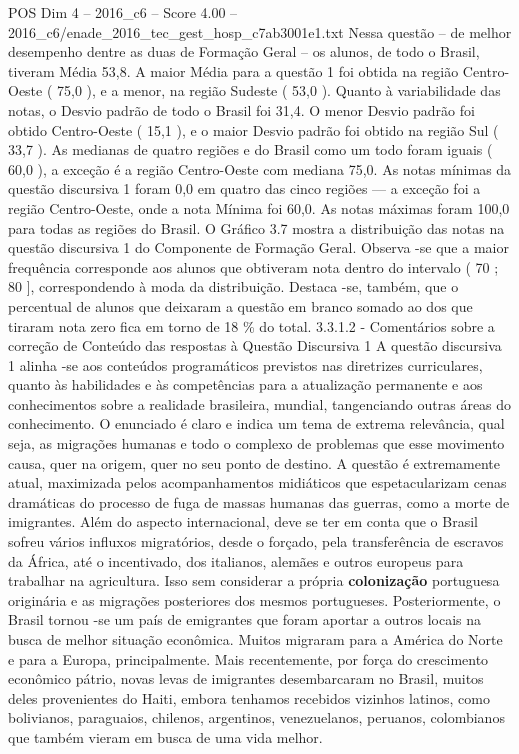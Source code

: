\begin{textsample}{POS Dim 4 – 2016\_c6 – Score 4.00 – 2016\_c6/enade\_2016\_tec\_gest\_hosp\_c7ab3001e1.txt}
Nessa questão – de melhor desempenho dentre as duas de Formação Geral – os alunos, de todo o Brasil, tiveram Média 53,8.
A maior Média para a questão 1 foi obtida na região Centro-Oeste ( 75,0 ), e a menor, na região Sudeste ( 53,0 ).
Quanto à variabilidade das notas, o Desvio padrão de todo o Brasil foi 31,4.
O menor Desvio padrão foi obtido Centro-Oeste ( 15,1 ), e o maior Desvio padrão foi obtido na região Sul ( 33,7 ).
As medianas de quatro regiões e do Brasil como um todo foram iguais ( 60,0 ), a exceção é a região Centro-Oeste com mediana 75,0.
As notas mínimas da questão discursiva 1 foram 0,0 em quatro das cinco regiões — a exceção foi a região Centro-Oeste, onde a nota Mínima foi 60,0.
As notas máximas foram 100,0 para todas as regiões do Brasil.
O Gráfico 3.7 mostra a distribuição das notas na questão discursiva 1 do Componente de Formação Geral.
Observa -se que a maior frequência corresponde aos alunos que obtiveram nota dentro do intervalo ( 70 ; 80 ], correspondendo à moda da distribuição.
Destaca -se, também, que o percentual de alunos que deixaram a questão em branco somado ao dos que tiraram nota zero fica em torno de 18 \% do total. 3.3.1.2 - Comentários sobre a correção de Conteúdo das respostas à Questão Discursiva 1 A questão discursiva 1 alinha -se aos conteúdos programáticos previstos nas diretrizes curriculares, quanto às habilidades e às competências para a atualização permanente e aos conhecimentos sobre a realidade brasileira, mundial, tangenciando outras áreas do conhecimento.
O enunciado é claro e indica um tema de extrema relevância, qual seja, as migrações humanas e todo o complexo de problemas que esse movimento causa, quer na origem, quer no seu ponto de destino.
A questão é extremamente atual, maximizada pelos acompanhamentos midiáticos que espetacularizam cenas dramáticas do processo de fuga de massas humanas das guerras, como a morte de imigrantes.
Além do aspecto internacional, deve se ter em conta que o Brasil sofreu vários influxos migratórios, desde o forçado, pela transferência de escravos da África, até o incentivado, dos italianos, alemães e outros europeus para trabalhar na agricultura.
Isso sem considerar a própria \textbf{colonização} portuguesa originária e as migrações posteriores dos mesmos portugueses.
Posteriormente, o Brasil tornou -se um país de emigrantes que foram aportar a outros locais na busca de melhor situação econômica.
Muitos migraram para a América do Norte e para a Europa, principalmente.
Mais recentemente, por força do crescimento econômico pátrio, novas levas de imigrantes desembarcaram no Brasil, muitos deles provenientes do Haiti, embora tenhamos recebidos vizinhos latinos, como bolivianos, paraguaios, chilenos, argentinos, venezuelanos, peruanos, colombianos que também vieram em busca de uma vida melhor.

\end{textsample}

